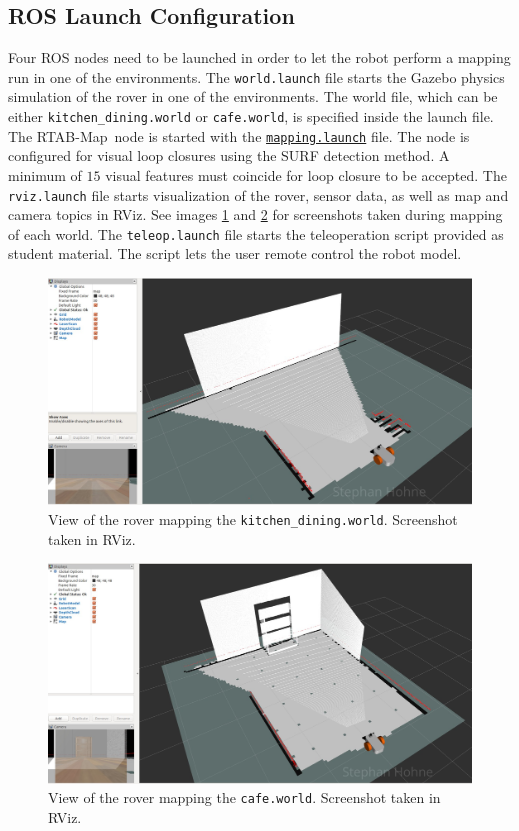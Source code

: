 \documentclass[10pt, journal, compsoc]{IEEEtran}
\newcommand{\rtab}{RTAB-Map}
\begin{document}
\subsection{ROS Launch Configuration}
\label{sec:ros_launch}
Four ROS nodes need to be launched in order to let the robot perform a mapping run in one of the environments. The \texttt{world.launch} file starts the Gazebo physics simulation of the rover in one of the environments. The world file, which can be either \texttt{kitchen\_dining.world} or \texttt{cafe.world}, is specified inside the launch file. The \rtab\ node is started with the \href{https://github.com/S2H-Mobile/RoboND-SLAM-Project/blob/master/slam_rover/launch/mapping.launch}{\texttt{mapping.launch}} file. The node is configured for visual loop closures using the SURF detection method. A minimum of $15$ visual features must coincide for loop closure to be accepted. The \texttt{rviz.launch} file starts visualization of the rover, sensor data, as well as map and camera topics in RViz. See images \ref{fig:rover_kitchen_dining_rviz} and \ref{fig:rover_cafe_rviz} for screenshots taken during mapping of each world. The \texttt{teleop.launch} file starts the teleoperation script provided as student material. The script lets the user remote control the robot model. 
\begin{figure}[thpb]
      \centering
      \includegraphics[width=\columnwidth]{images/rover_kitchen_dining_rviz.jpg}
      \caption{View of the rover mapping the \texttt{kitchen\_dining.world}. Screenshot taken in RViz.}
      \label{fig:rover_kitchen_dining_rviz}
\end{figure}
\begin{figure}[thpb]
      \centering
      \includegraphics[width=\columnwidth]{images/rover_cafe_rviz.jpg}
      \caption{View of the rover mapping the \texttt{cafe.world}. Screenshot taken in RViz.}
      \label{fig:rover_cafe_rviz}
\end{figure}
\end{document}
